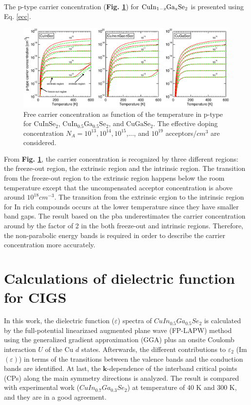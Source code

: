 \documentclass[a4paper, 12pt, titlepage,oneside,drop]{kthesis}
\begin{document}
The p-type carrier concentration (\textbf{Fig. \ref{ptypecc}}) for $\mathrm { CuIn_{1-\textit{x}}Ga_{x}Se_2}$ is presented using Eq. \ref{ecc}. 

 \begin{figure}[H]
    \begin{center}
            \includegraphics[width=1\textwidth,clip]{paper2figure9}
     \end{center}
    \caption{Free carrier concentration as function of the temperature in p-type for $\mathrm{CuInSe_2}$, $\mathrm{CuIn_{0.5}Ga_{0.5}Se_2}$, and $\mathrm{CuGaSe_2}$.
    The effective doping concentration $N_A = 10^{13}, 10^{14}, 10^{15}$,..., and  $10^{19}$ acceptors/$cm^3$ are considered.}
   \label{ptypecc}
\end{figure}

From \textbf{Fig. \ref{ptypecc}}, the carrier concentration is recognized by three different regions: the freeze-out region, the extrinsic region and the intrinsic region. The 
transition from the freeze-out region to the extrinsic region happens below the room temperature except that the uncompensated acceptor concentration is above around 
$10^{18} cm^{-3}$. The transition from the extrinsic ergion to the intrinsic region for In rich compounds occurs at the lower temperature since they have smaller band gaps.
The result based on the pba underestimates the carrier concentration around by the factor of 2 in the both freeze-out and intrinsic regions. Therefore, the 
non-parabolic energy bands is required in order to describe the carrier concentration more accurately.


\section{Calculations of dielectric function for CIGS}
In this work, the dielectric function ($\varepsilon$) spectra of $CuIn_{0.5}Ga_{0.5}Se_2$ is calculated by the full-potential linearizaed augmented plane wave (FP-LAPW) method using the generalized gradient approximation (GGA)
plus an onsite Coulomb interaction $U$ of the Cu $d$ states. Afterwards, the different contributions to $\varepsilon_2$ (Im$(\varepsilon)$) in terms of the transitions between the valence bands and the conduction bands are identified. At last, 
the $\textbf{k}$-dependence of the interband critical points (CPs) along the main symmetry directions is analyzed. The result is compared with experimental work ($CuIn_{0.7}Ga_{0.3}Se_2$) at temperature of 40 K and 300 K,
and they are in a good agreement.
\end{document}
